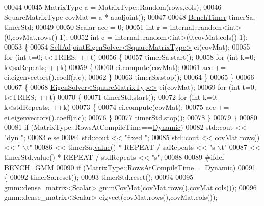 \begin{DoxyCode}
00044 
00045   MatrixType a = MatrixType::Random(rows,cols);
00046   SquareMatrixType covMat =  a * a.adjoint();
00047 
00048   \hyperlink{class_eigen_1_1_bench_timer}{BenchTimer} timerSa, timerStd;
00049 
00050   Scalar acc = 0;
00051   \textcolor{keywordtype}{int} r = internal::random<int>(0,covMat.rows()-1);
00052   \textcolor{keywordtype}{int} c = internal::random<int>(0,covMat.cols()-1);
00053   \{
00054     \hyperlink{group___eigenvalues___module_class_eigen_1_1_self_adjoint_eigen_solver}{SelfAdjointEigenSolver<SquareMatrixType>} ei(covMat);
00055     \textcolor{keywordflow}{for} (\textcolor{keywordtype}{int} t=0; t<TRIES; ++t)
00056     \{
00057       timerSa.start();
00058       \textcolor{keywordflow}{for} (\textcolor{keywordtype}{int} k=0; k<saRepeats; ++k)
00059       \{
00060         ei.compute(covMat);
00061         acc += ei.eigenvectors().coeff(r,c);
00062       \}
00063       timerSa.stop();
00064     \}
00065   \}
00066 
00067   \{
00068     \hyperlink{group___eigenvalues___module_class_eigen_1_1_eigen_solver}{EigenSolver<SquareMatrixType>} ei(covMat);
00069     \textcolor{keywordflow}{for} (\textcolor{keywordtype}{int} t=0; t<TRIES; ++t)
00070     \{
00071       timerStd.start();
00072       \textcolor{keywordflow}{for} (\textcolor{keywordtype}{int} k=0; k<stdRepeats; ++k)
00073       \{
00074         ei.compute(covMat);
00075         acc += ei.eigenvectors().coeff(r,c);
00076       \}
00077       timerStd.stop();
00078     \}
00079   \}
00080 
00081   \textcolor{keywordflow}{if} (MatrixType::RowsAtCompileTime==\hyperlink{namespace_eigen_ad81fa7195215a0ce30017dfac309f0b2}{Dynamic})
00082     std::cout << \textcolor{stringliteral}{"dyn   "};
00083   \textcolor{keywordflow}{else}
00084     std::cout << \textcolor{stringliteral}{"fixed "};
00085   std::cout << covMat.rows() << \textcolor{stringliteral}{" \(\backslash\)t"}
00086             << timerSa.\hyperlink{class_eigen_1_1_bench_timer_a26760f963ed8b64c126159bfea57735e}{value}() * REPEAT / saRepeats << \textcolor{stringliteral}{"s \(\backslash\)t"}
00087             << timerStd.\hyperlink{class_eigen_1_1_bench_timer_a26760f963ed8b64c126159bfea57735e}{value}() * REPEAT / stdRepeats << \textcolor{stringliteral}{"s"};
00088 
00089 \textcolor{preprocessor}{  #ifdef BENCH\_GMM}
00090   \textcolor{keywordflow}{if} (MatrixType::RowsAtCompileTime==\hyperlink{namespace_eigen_ad81fa7195215a0ce30017dfac309f0b2}{Dynamic})
00091   \{
00092     timerSa.reset();
00093     timerStd.reset();
00094 
00095     gmm::dense\_matrix<Scalar> gmmCovMat(covMat.rows(),covMat.cols());
00096     gmm::dense\_matrix<Scalar> eigvect(covMat.rows(),covMat.cols());

\end{DoxyCode}
